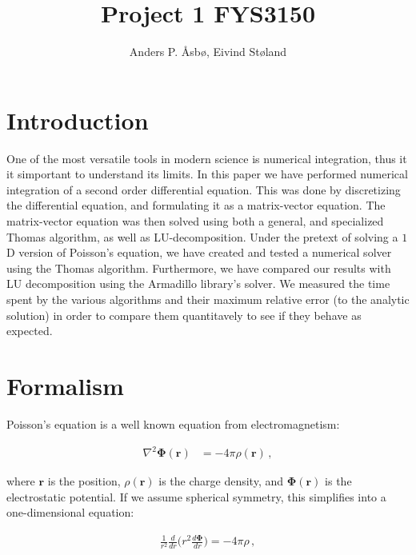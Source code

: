 \documentclass[english,notitlepage,reprint]{revtex4-1}  %
\begin{document}
\title{Project 1 FYS3150}   %
\author{Anders P. Åsbø, Eivind Støland}               %

\noaffiliation                            %

\maketitle
\tableofcontents

\section{Introduction} \label{sec:I}

One of the most versatile tools in modern science is numerical integration, thus it it simportant to understand its limits. In this paper we have performed numerical integration of a second order differential equation. This was done by discretizing the differential equation, and formulating it as a matrix-vector equation. The matrix-vector equation was then solved using both a general, and specialized Thomas algorithm, as well as LU-decomposition. Under the pretext of solving a \(1\)D version of Poisson's equation, we have created and tested a numerical solver using the Thomas algorithm. Furthermore, we have compared our results with LU decomposition using the Armadillo library's solver. We measured the time spent by the various algorithms and their maximum relative error (to the analytic solution) in order to compare them quantitavely to see if they behave as expected. 





\section{Formalism} \label{sec:II}

Poisson's equation is a well known equation from electromagnetism:

\begin{align*}
\nabla^2 \boldsymbol\Phi (\boldsymbol r) &= -4\pi \rho (\boldsymbol r) \, ,
\end{align*}

where $\boldsymbol r$ is the position, $\rho(\boldsymbol r)$ is the charge density, and $\boldsymbol \Phi (\boldsymbol r)$ is the electrostatic potential. If we assume spherical symmetry, this simplifies into a one-dimensional equation:

\begin{align*}
\frac{1}{r^2} \frac{d}{dr} \bigg(r^2 \frac{d\boldsymbol \Phi}{dr} \bigg) = - 4\pi \rho \, ,
\end{align*}
\end{document}
